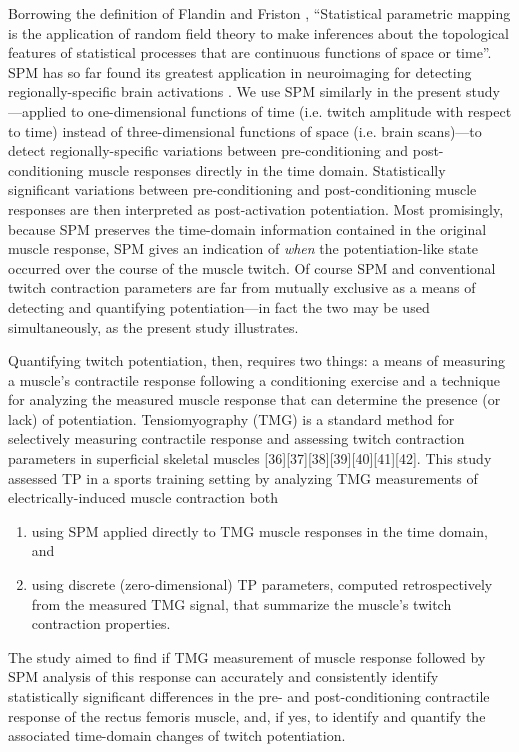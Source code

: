 \documentclass[utf8]{style/FrontiersinHarvard}
\begin{document}
Borrowing the definition of Flandin and Friston \cite{flandin}, 
``Statistical parametric mapping is the application of random field theory to make inferences about the topological features of statistical processes that are continuous functions of space or time''.
SPM has so far found its greatest application in neuroimaging for detecting regionally-specific brain activations \cite{friston}.
We use SPM similarly in the present study---applied to one-dimensional functions of time (i.e. twitch amplitude with respect to time) instead of three-dimensional functions of space (i.e. brain scans)---to detect regionally-specific variations between pre-conditioning and post-conditioning muscle responses directly in the time domain.
Statistically significant variations between pre-conditioning and post-conditioning muscle responses are then interpreted as post-activation potentiation.
Most promisingly, because SPM preserves the time-domain information contained in the original muscle response, SPM gives an indication of \textit{when} the potentiation-like state occurred over the course of the muscle twitch.
Of course SPM and conventional twitch contraction parameters are far from mutually exclusive as a means of detecting and quantifying potentiation---in fact the two may be used simultaneously, as the present study illustrates.

Quantifying twitch potentiation, then, requires two things: a means of measuring a muscle's contractile response following a conditioning exercise and a technique for analyzing the measured muscle response that can determine the presence (or lack) of potentiation.
Tensiomyography (TMG) is a standard method for selectively measuring contractile response and assessing twitch contraction parameters in superficial skeletal muscles [36][37][38][39][40][41][42].
This study assessed TP in a sports training setting by analyzing TMG measurements of electrically-induced muscle contraction both
\begin{enumerate}

    \item using SPM applied directly to TMG muscle responses in the time domain, and

    \item using discrete (zero-dimensional) TP parameters, computed retrospectively from the measured TMG signal, that summarize the muscle's twitch contraction properties.

\end{enumerate}
The study aimed to find if TMG measurement of muscle response followed by SPM analysis of this response can accurately and consistently identify statistically significant differences in the pre- and post-conditioning contractile response of the rectus femoris muscle, and,
if yes, to identify and quantify the associated time-domain changes of twitch potentiation.
\end{document}
